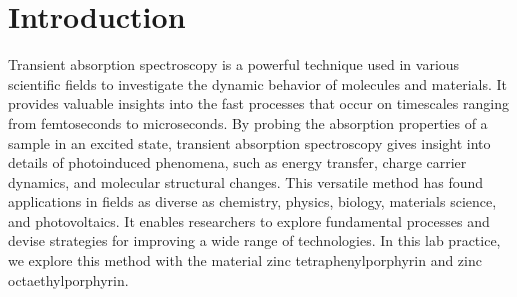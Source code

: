 

\chapter{Introduction}
\label{chap:einleitung}

Transient absorption spectroscopy is a powerful technique used in various scientific fields to investigate the dynamic behavior of molecules and materials. It provides valuable insights into the fast processes that occur on timescales ranging from femtoseconds to microseconds. By probing the absorption properties of a sample in an excited state, transient absorption spectroscopy gives insight into details of photoinduced phenomena, such as energy transfer, charge carrier dynamics, and molecular structural changes. This versatile method has found applications in fields as diverse as chemistry, physics, biology, materials science, and photovoltaics. It enables researchers to explore fundamental processes and devise strategies for improving a wide range of technologies. In this lab practice, we explore this method with the material zinc tetraphenylporphyrin and zinc octaethylporphyrin.

